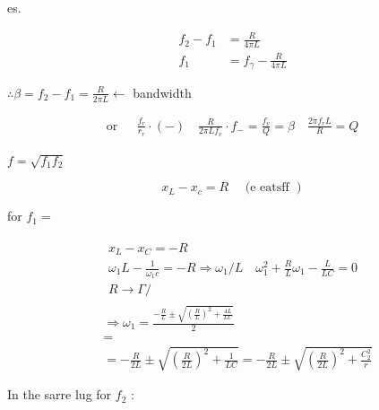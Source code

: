\documentclass[12pt, a4paper]{article}
\begin{document}
	es.

	$$
		\begin{aligned}
			f_{2}-f_{1} & =\frac{R}{4 \pi L}            \\
			f_{1}       & =f_{\gamma}-\frac{R}{4 \pi L}
		\end{aligned}
	$$

$\therefore \beta=f_{2}-f_{1}=\frac{R}{2 \pi L} \leftarrow$ bandwidth

	$$
		\text { or } \begin{aligned}
			 & \frac{f_{r}}{r_{r}} \cdot(-) \quad \frac{R}{2 \pi L f_{v}} \cdot f_{-}=\frac{f_{v}}{Q}=\beta \quad \frac{2 \pi f_{r} L}{R}=Q
		\end{aligned}
	$$

$f=\sqrt{f_{1} f_{2}}$

	$$
		\left.x_{L}-x_{c}=R \quad \text { (e eatsff }\right)
	$$

	for $f_{1}=$

	$$
		\begin{aligned}
			 & \begin{array}{l}
				   x_{L}-x_{C}=-R                                                                                                                \\
				   \omega_{1} L-\frac{1}{\omega_{1} c}=-R \Rightarrow \omega_{1} / L \quad \omega_{1}^{2}+\frac{R}{L} \omega_{1}-\frac{L}{L C}=0 \\
				   R \rightarrow \Gamma /
			   \end{array}           \\
			 & \Rightarrow \omega_{1}=\frac{-\frac{R}{L} \pm \sqrt{\left(\frac{R}{L}\right)^{2}+\frac{4 L}{L C}}}{2}                                                \\
			 & =                                                                                                                                                    \\
			 & =-\frac{R}{2 L} \pm \sqrt{\left(\frac{R}{2 L}\right)^{2}+\frac{1}{L C}}=-\frac{R}{2 L} \pm \sqrt{\left(\frac{R}{2 L}\right)^{2}+\frac{C_{2}^{2}}{r}}
		\end{aligned}
	$$

	In the sarre lug for $f_{2}$ :
\end{document}

